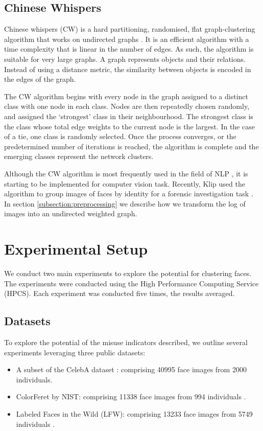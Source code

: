 \documentclass[a4paper,12pt]{report}
\begin{document}
	\subsection{Chinese Whispers}
	Chinese whispers (CW) is a hard partitioning, randomised, flat graph-clustering algorithm that works on undirected graphs \cite{biemann2006chinese}. It is an efficient algorithm with a time complexity that is linear in the number of edges. As such, the algorithm is suitable for very large graphs. A graph represents objects and their relations. Instead of using a distance metric, the similarity between objects is encoded in the edges of the graph. 
	
	The CW algorithm begins with every node in the graph assigned to a distinct class with one node in each class. Nodes are then repeatedly chosen randomly, and assigned the ‘strongest’ class in their neighbourhood. The strongest class is the class whose total edge weights to the current node is the largest. In the case of a tie, one class is randomly selected. Once the process converges, or the predetermined number of iterations is reached, the algorithm is complete and the emerging classes represent the network clusters. 
	
	Although the CW algorithm is most frequently used in the field of NLP \cite{di2013clustering}, it is starting to be implemented for computer vision task. Recently, Klip used the algorithm to group images of faces by identity for a forensic investigation task \cite{klip2019fuzzy}. In section \ref{subsection:preprocessing} we describe how we transform the log of images into an undirected weighted graph.
	
	\section{Experimental Setup}
	We conduct two main experiments to explore the potential for clustering faces. The experiments were conducted using the High Performance Computing Service (HPCS). Each experiment was conducted five times, the results averaged.
	
	\subsection{Datasets}
	\label{subsection:datasets}
	To explore the potential of the misuse indicators described, we outline several experiments leveraging three public datasets:
	\begin{itemize}
		\item A subset of the CelebA dataset \cite{liu2015faceattributes}: comprising 40995 face images from 2000 individuals.
		\item ColorFeret by NIST: comprising 11338 face images from 994 individuals \cite{phillips1998feret}.
		\item Labeled Faces in the Wild (LFW): comprising 13233 face images from 5749 individuals \cite{LFWTech}. 
	\end{itemize}
	
\end{document}
